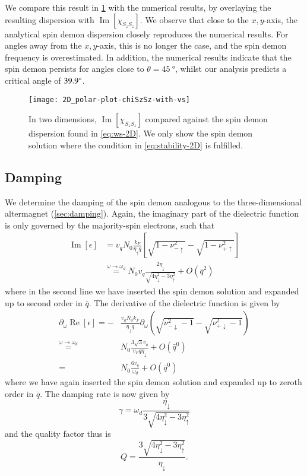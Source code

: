 \documentclass[aps,prb,reprint,twocolumns,superscriptaddress,nofootinbib]{revtex4-2}
\DeclareMathOperator{\Imm}{Im}
\DeclareMathOperator{\Ree}{Re}
\newcommand{\kF}{k_{F}}
\begin{document}
	We compare this result in \cref{fig:compare2D} with the numerical results, by overlaying the resulting dispersion with $\Imm[\chi_{S_zS_z}]$. We observe that close to the $x,y$-axis, the analytical spin demon dispersion closely reproduces the numerical results. For angles away from the $x,y$-axis, this is no longer the case, and the spin demon frequency is overestimated. In addition, the numerical results indicate that the spin demon persists for angles close to $\theta=\SI{45}{\degree}$, whilst our analysis predicts a critical angle of $\SI{39.9}{\degree}$. 
	\begin{figure}
		\texttt{[image: 2D\_polar-plot-chiSzSz-with-vs]}
		\caption{In two dimensions, $\Imm[\chi_{S_zS_z}]$ compared against the spin demon dispersion found in \cref{eq:ws-2D}. We only show the spin demon solution where the condition in \cref{eq:stability-2D} is fulfilled.  \label{fig:compare2D} }
	\end{figure}
	
	
	
	\subsection{Damping}
	We determine the damping of the spin demon analogous to the three-dimensional altermagnet (\cref{sec:damping}). Again, the imaginary part of the dielectric function is only governed by the majority-spin electrons, such that 
	\begin{align}
		\Imm[\epsilon] &= v_q N_0 \frac{\kF}{\eta_\uparrow q} \left[\sqrt{1-\nu_{-\uparrow}^2}-\sqrt{1-\nu_{+\uparrow}^2}\right] \\
		&\overset{\omega\rightarrow\omega_{d}}{=}N_0v_q\frac{2\eta_\downarrow}{\sqrt{4\eta_\downarrow^2-3\eta_\uparrow^2}}+ O(\bar q^2)
	\end{align}
	where in the second line we have inserted the spin demon solution and expanded up to second order in $\bar q$.
	The derivative of the dielectric function is given by
	\begin{align}
		\partial_\omega \Ree[\epsilon] = -&\frac{v_q N_0 \kF}{\eta_\downarrow q} \partial_\omega \left(\sqrt{\nu_{-\downarrow}^2-1}-\sqrt{\nu_{+\downarrow}^2-1}\right) \\ 
		\overset{\omega\rightarrow\omega_{d}}{=}&N_0\frac{3\sqrt{3} v_q}{v_F q\eta_\downarrow} + O(\bar q^0)\\
		=&N_0\frac{6v_q}{\omega_{d}}+ O(\bar q^0)
	\end{align}
	where we have again inserted the spin demon solution and expanded up to zeroth order in $\bar q$.
	The damping rate is now given by
	\begin{equation}
		\gamma = \omega_{d}\frac{\eta_\downarrow}{3\sqrt{4\eta_\downarrow^2-3\eta_\uparrow^2}}
	\end{equation}
	and the quality factor thus is
	\begin{equation}
		Q = \frac{3\sqrt{4\eta_\downarrow^2-3\eta_\uparrow^2}}{\eta_\downarrow}.
	\end{equation}
	
\end{document}
